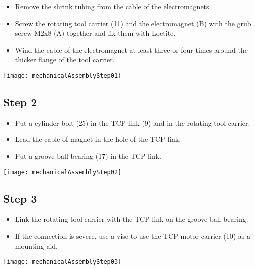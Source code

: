 \begin{minipage}[t]{0.6\textwidth}
	\begin{itemize}
		\item Remove the shrink tubing from the cable of the electromagnets.
		\item Screw the rotating tool carrier (11) and the electromagnet (B) with the grub screw M2x8 (A) together and fix them with Loctite. 
		\item Wind the cable of the electromagnet at least three or four times around the thicker flange of the tool carrier.
	\end{itemize}
\end{minipage}
\hfill
\begin{minipage}[t]{0.35\textwidth}
	\vspace{-\ht\strutbox}\texttt{[image: mechanicalAssemblyStep01]}
	\label{fig:MechanicalAssebmlyStep01}
\end{minipage}

\subsection*{Step 2}

\begin{minipage}[t]{0.6\textwidth}
	\begin{itemize}
		\item Put a cylinder bolt (25) in the TCP link (9) and in the rotating tool carrier.
		\item Lead the cable of magnet in the hole of the TCP link.
		\item Put a groove ball bearing (17) in the TCP link.
	\end{itemize}
\end{minipage}
\hfill
\begin{minipage}[t]{0.35\textwidth}
	\vspace{-\ht\strutbox}\texttt{[image: mechanicalAssemblyStep02]}
	\label{fig:MechanicalAssebmlyStep02} 
\end{minipage}

\subsection*{Step 3}

\begin{minipage}[t]{0.6\textwidth}
	\begin{itemize}
		\item Link the rotating tool carrier with the TCP link on the groove ball bearing.
		\item If the connection is severe, use a vise to use the TCP motor carrier (10) as a mounting aid.
	\end{itemize}
\end{minipage}
\hfill
\begin{minipage}[t]{0.35\textwidth}
	\vspace{-\ht\strutbox}\texttt{[image: mechanicalAssemblyStep03]}
	\label{fig:MechanicalAssebmlyStep03} 
\end{minipage}

